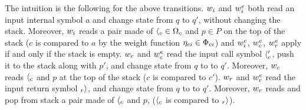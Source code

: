 \noindent
The intuition is the following for the above transitions.
%
\noindent
$\weii$ and $\weiei$ both read an input internal symbol $a$ and change state from $q$ to $q'$, 
without changing the stack. 
Moreover, $\weii$ reads a pair made of 
${\call{c}} \in \Omegac$ and $p \in P$ on the top of the stack 
($c$ is compared to $a$ by the weight function $\eta_\mathsf{ci} \in \Phici$)
and $\weiei$, $\weiec$, $\weier$ apply if and only if the stack is empty.
%
\noindent
$\weic$ and $\weiec$ read the input call symbol $\langle_{c}'$, 
push it to the stack along with $p'$, and change state from $q$ to to $q'$.
Moreover, $\weic$ reads ${\langle_{c}}$ and $p$ at the top of the stack 
($c$ is compared to $c'$).
%
\noindent
$\weir$ and $\weier$ read the input return symbol $_{r}{\rangle}$, and change state from $q$ to to $q'$.
Moreover, $\weir$ reads and pop from stack a pair made of $\langle_{c}$ and $p$, 
($\langle_{c}$ is compared to $_{r}{\rangle}$).

